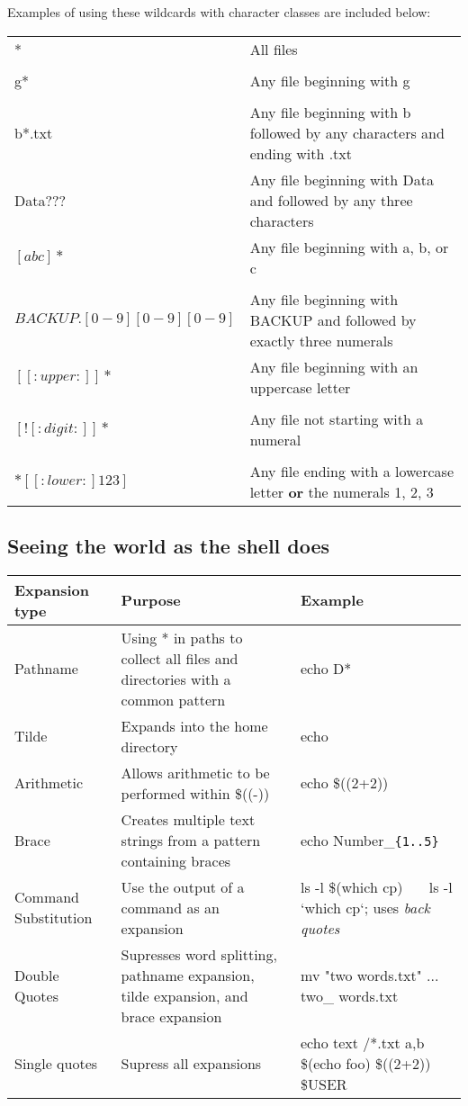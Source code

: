 \documentclass[12pt]{article}
\begin{document}
\vskip 0.2in

Examples of using these wildcards with character classes are included below:\newline
\noindent\begin{tabular}{|l|p{4in}|}
	\hline
	* & All files\\
	&\\
	g* & Any file beginning with g\\&\\
	b*.txt & Any file beginning with b followed by any characters and ending with .txt\\
	Data??? & Any file beginning with Data and followed by any three characters\\
	$[abc]*$ & Any file beginning with a, b, or c\\&\\
	$BACKUP.[0-9][0-9][0-9]$ & Any file beginning with BACKUP and followed by exactly three numerals\\
	$[[:upper:]]*$ & Any file beginning with an uppercase letter\\&\\
	$[![:digit:]]*$ & Any file not starting with a numeral\\&\\
	$*[[:lower:]123]$ & Any file ending with a lowercase letter \textbf{or} the numerals 1,  2, 3\\ \hline

\end{tabular}

\subsection{Seeing the world as the shell does}
\begin{tabular}{|l|p{3in}|p{2in}|}
	\hline
	Expansion type & Purpose & Example\\ \hline
	Pathname & Using * in paths to collect all files and directories with a common pattern & echo D*\\
	Tilde & Expands into the home directory & echo ~\\
	Arithmetic & Allows arithmetic to be performed within \$((-)) & echo \$((2+2))\\
	Brace & Creates multiple text strings from a pattern containing braces & echo Number\_\texttt{\{1..5\}} \\
	Command Substitution & Use the output of a command as an expansion & ls -l \$(which cp) ~~~\newline ls -l `which cp`;
	uses \textit{back quotes}\\
	Double Quotes & Supresses word splitting, pathname expansion, tilde expansion, and brace expansion & mv "two words.txt" ... \newline two\_ words.txt\\
	Single quotes & Supress all expansions & echo text /*.txt {a,b} \$(echo foo) \$((2+2)) \$USER\\
	
	\hline
\end{tabular}
\end{document}
